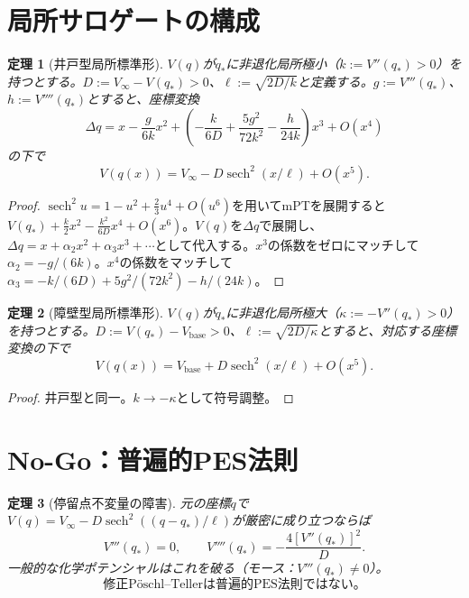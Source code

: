 \documentclass[12pt]{article}
\theoremstyle{plain}
\newtheorem{theorem}{定理}[section]
\theoremstyle{definition}
\numberwithin{equation}{section}
\DeclareMathOperator{\sech}{sech}
\begin{document}
\section{局所サロゲートの構成}\label{sec:mPT}

\begin{theorem}[井戸型局所標準形]\label{thm:well}
$V(q)$が$q_*$に非退化局所極小（$k:=V''(q_*)>0$）を持つとする。$D:=V_\infty-V(q_*)>0$、$\ell:=\sqrt{2D/k}$と定義する。$g:=V'''(q_*)$、$h:=V''''(q_*)$とすると、座標変換
\begin{equation}
\Delta q = x - \frac{g}{6k}x^2 + \left(-\frac{k}{6D}+\frac{5g^2}{72k^2}-\frac{h}{24k}\right)x^3 + O(x^4)
\end{equation}
の下で
\begin{equation}
\boxed{V(q(x)) = V_\infty - D\sech^2(x/\ell) + O(x^5).}
\end{equation}
\end{theorem}

\begin{proof}
$\sech^2 u=1-u^2+\frac{2}{3}u^4+O(u^6)$を用いてmPTを展開すると$V(q_*)+\frac{k}{2}x^2-\frac{k^2}{6D}x^4+O(x^6)$。$V(q)$を$\Delta q$で展開し、$\Delta q=x+\alpha_2 x^2+\alpha_3 x^3+\cdots$として代入する。$x^3$の係数をゼロにマッチして$\alpha_2=-g/(6k)$。$x^4$の係数をマッチして$\alpha_3=-k/(6D)+5g^2/(72k^2)-h/(24k)$。
\end{proof}

\begin{theorem}[障壁型局所標準形]\label{thm:barrier}
$V(q)$が$q_*$に非退化局所極大（$\kappa:=-V''(q_*)>0$）を持つとする。$D:=V(q_*)-V_{\mathrm{base}}>0$、$\ell:=\sqrt{2D/\kappa}$とすると、対応する座標変換の下で
\begin{equation}
\boxed{V(q(x)) = V_{\mathrm{base}} + D\sech^2(x/\ell) + O(x^5).}
\end{equation}
\end{theorem}

\begin{proof}
井戸型と同一。$k\to-\kappa$として符号調整。
\end{proof}


\section{No-Go：普遍的PES法則}\label{sec:nogo_PES}

\begin{theorem}[停留点不変量の障害]\label{thm:nogo_PES}
元の座標$q$で$V(q)=V_\infty-D\sech^2((q-q_*)/\ell)$が厳密に成り立つならば
\begin{equation}
\boxed{V'''(q_*)=0,\qquad V''''(q_*)=-\frac{4[V''(q_*)]^2}{D}.}
\end{equation}
一般的な化学ポテンシャルはこれを破る（モース：$V'''(q_*)\neq 0$）。
\begin{equation}
\boxed{\text{修正P\"oschl--Tellerは普遍的PES法則ではない。}}
\end{equation}
\end{theorem}
\end{document}
